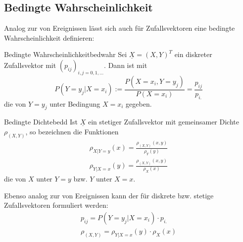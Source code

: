 \subsection{Bedingte Wahrscheinlichkeit}

Analog zur  von Ereignissen lässt sich
auch für Zufallsvektoren eine bedingte Wahrscheinlichkeit definieren:

\begin{definition}{Bedingte Wahrscheinlichkeit}{bedwahr}
Sei $\underline{X} = (X, Y)^T$ ein diskreter Zufallsvektor mit
 $(p_{ij})_{i,j=0,1,...}$. Dann ist
mit
\[
P(Y=y_j|X=x_i) := \frac{P(X=x_i, Y=y_j)}{P(X=x_i)} = \frac{p_{ij}}{p_{i.}}
\]
die  von $Y=y_j$ unter Bedingung $X=x_i$ gegeben.
\end{definition}

\begin{definition}{Bedingte Dichte}{bedd}
Ist $\underline{X}$ ein stetiger Zufallsvektor mit gemeinsamer Dichte
$\rho_{(X,Y)}$, so bezeichnen die Funktionen
\begin{align*}
\rho_{X|Y=y}(x) = \frac{\rho_{(X,Y)}(x,y)}{\rho_Y(y)}\\
\rho_{Y|X=x}(y) = \frac{\rho_{(X,Y)}(x,y)}{\rho_X(x)}
\end{align*}
die  von $X$ unter $Y=y$ bzw. $Y$ unter $X=x$.
\end{definition}

Ebenso analog zur  von Ereignissen kann
der  für diskrete bzw. stetige Zufallsvektoren
formuliert werden:
\begin{align*}
p_{ij} = P(Y=y_j|X=x_i)\cdot p_{i.}\\
\rho_{(X,Y)} = \rho_{Y|X=x}(y)\cdot\rho_X(x)
\end{align*}
